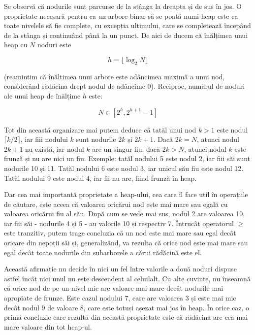 Se observă că nodurile sunt parcurse de la stânga la dreapta și de sus în
jos. O proprietate necesară pentru ca un arbore binar să se poată numi heap
este ca toate nivelele să fie complete, cu excepția ultimului, care se
completează începând de la stânga și continuând până la un punct. De aici de
ducem că înălțimea unui heap cu $N$ noduri este

\begin{equation}
  h = \lfloor \log_2 N \rfloor
\end{equation}

(reamintim că înălțimea unui arbore este adâncimea maximă a unui nod,
considerând rădăcina drept nodul de adâncime 0). Reciproc, numărul de noduri
ale unui heap de înălțime $h$ este:

\begin{equation}
  N \in [2^h, 2^{h+1} - 1]
\end{equation}

Tot din această organizare mai putem deduce că tatăl unui nod $k>1$ este nodul
$\lceil k/2 \rceil$, iar fiii nodului $k$ sunt nodurile $2k$ și $2k+1$. Dacă
$2k=N$, atunci nodul $2k+1$ nu există, iar nodul $k$ are un singur fiu; dacă
$2k>N$, atunci nodul $k$ este frunză și nu are nici un fiu. Exemple: tatăl
nodului 5 este nodul 2, iar fiii săi sunt nodurile 10 și 11. Tatăl nodului 6
este nodul 3, iar unicul său fiu este nodul 12. Tatăl nodului 9 este nodul 4,
iar fii nu are, fiind frunză în heap.

Dar cea mai importantă proprietate a heap-ului, cea care îl face util în
operațiile de căutare, este aceea că valoarea oricărui nod este mai mare sau
egală cu valoarea oricărui fiu al său. După cum se vede mai sus, nodul 2 are
valoarea 10, iar fiii săi - nodurile 4 și 5 - au valorile 10 și respectiv
7. Întrucât operatorul $\geq$ este tranzitiv, putem trage concluzia că un nod
este mai mare sau egal decât oricare din nepoții săi și, generalizând, va
rezulta că orice nod este mai mare sau egal decât toate nodurile din
subarborele a cărui rădăcină este el.

Această afirmație nu decide în nici un fel între valorile a două noduri
dispuse astfel încât nici unul nu este descendent al celuilalt. Cu alte
cuvinte, nu înseamnă că orice nod de pe un nivel mic are valoare mai mare
decât nodurile mai apropiate de frunze. Este cazul nodului 7, care are
valoarea 3 și este mai mic decât nodul 9 de valoare 8, care este totuși așezat
mai jos în heap. În orice caz, o primă concluzie care rezultă din această
proprietate este că rădăcina are cea mai mare valoare din tot heap-ul.

